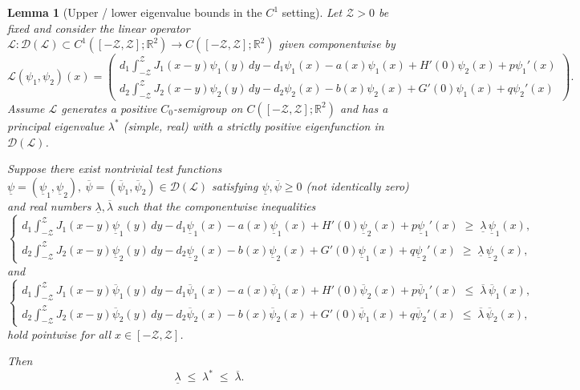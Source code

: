 \documentclass[a4paper,11pt]{amsart}
\newtheorem{lemma}[theorem]{Lemma}
\theoremstyle{definition}
\numberwithin{equation}{section}
\theoremstyle{definition}
\begin{document}
\begin{lemma}[Upper / lower eigenvalue bounds in the $C^1$ setting]\label{LemmaUpperLower}
Let ${\mathcal Z}>0$ be fixed and consider the linear operator
$\mathcal L:\mathcal D(\mathcal L)\subset C^1([-\mathcal Z,\mathcal Z];\mathbb R^2)\to C([-\mathcal Z,\mathcal Z];\mathbb R^2)$
given componentwise by
\[
\mathcal L(\psi_1,\psi_2)(x)
=
\begin{pmatrix}
d_1\displaystyle\int_{-{\mathcal Z}}^{\mathcal Z}J_1(x-y)\psi_1(y)\,dy - d_1\psi_1(x) - a(x)\psi_1(x) + H'(0)\psi_2(x) + p\psi_1'(x)\\[8pt]
d_2\displaystyle\int_{-{\mathcal Z}}^{\mathcal Z}J_2(x-y)\psi_2(y)\,dy - d_2\psi_2(x) - b(x)\psi_2(x) + G'(0)\psi_1(x) + q\psi_2'(x)
\end{pmatrix}.
\]
Assume \(\mathcal L\) generates a positive \(C_0\)-semigroup on \(C([-\mathcal Z,\mathcal Z];\mathbb R^2)\)
and has a principal eigenvalue \(\lambda^\ast\) (simple, real) with a strictly positive eigenfunction in \(\mathcal D(\mathcal L)\).


Suppose there exist nontrivial test functions
\(\underline\psi=(\underline\psi_1,\underline\psi_2),\ \overline\psi=(\overline\psi_1,\overline\psi_2)\in\mathcal D(\mathcal L)\)
satisfying \(\underline\psi,\overline\psi\ge0\) (not identically zero) and real numbers \(\underline\lambda,\overline\lambda\) such that the componentwise inequalities
\begin{equation}\label{eq:subsuper}
\begin{cases}
d_1\displaystyle\int_{-{\mathcal Z}}^{\mathcal Z}J_1(x-y)\underline\psi_1(y)\,dy - d_1\underline\psi_1(x) - a(x)\underline\psi_1(x) + H'(0)\underline\psi_2(x) + p\underline\psi_1'(x)
\;\geq\; \underline\lambda\,\underline\psi_1(x),\\[6pt]
d_2\displaystyle\int_{-{\mathcal Z}}^{\mathcal Z}J_2(x-y)\underline\psi_2(y)\,dy - d_2\underline\psi_2(x) - b(x)\underline\psi_2(x) + G'(0)\underline\psi_1(x) + q\underline\psi_2'(x)
\;\geq\; \underline\lambda\,\underline\psi_2(x),
\end{cases}
\end{equation}
and
\begin{equation}\label{eq:supersuper}
\begin{cases}
d_1\displaystyle\int_{-{\mathcal Z}}^{\mathcal Z}J_1(x-y)\overline\psi_1(y)\,dy - d_1\overline\psi_1(x) - a(x)\overline\psi_1(x) + H'(0)\overline\psi_2(x) + p\overline\psi_1'(x)
\;\leq\; \overline\lambda\,\overline\psi_1(x),\\[6pt]
d_2\displaystyle\int_{-{\mathcal Z}}^{\mathcal Z}J_2(x-y)\overline\psi_2(y)\,dy - d_2\overline\psi_2(x) - b(x)\overline\psi_2(x) + G'(0)\overline\psi_1(x) + q\overline\psi_2'(x)
\;\leq\; \overline\lambda\,\overline\psi_2(x),
\end{cases}
\end{equation}
hold pointwise for all \(x\in[-{\mathcal Z},{\mathcal Z}]\).

Then
\[
\underline\lambda \;\leq\; \lambda^\ast \;\leq\; \overline\lambda.
\]
\end{lemma}
\end{document}
